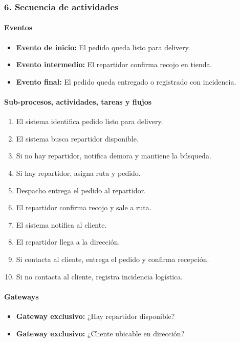 \documentclass[a4paper,12pt]{article}
\begin{document}
\subsubsection*{6. Secuencia de actividades}

\paragraph{Eventos}

\begin{itemize}
    \item \textbf{Evento de inicio:} El pedido queda listo para delivery.
    \item \textbf{Evento intermedio:} El repartidor confirma recojo en tienda.
    \item \textbf{Evento final:} El pedido queda entregado o registrado con incidencia.
\end{itemize}

\paragraph{Sub-procesos, actividades, tareas y flujos}

\begin{enumerate}
    \item El sistema identifica pedido listo para delivery.
    \item El sistema busca repartidor disponible.
    \item Si no hay repartidor, notifica demora y mantiene la búsqueda.
    \item Si hay repartidor, asigna ruta y pedido.
    \item Despacho entrega el pedido al repartidor.
    \item El repartidor confirma recojo y sale a ruta.
    \item El sistema notifica al cliente.
    \item El repartidor llega a la dirección.
    \item Si contacta al cliente, entrega el pedido y confirma recepción.
    \item Si no contacta al cliente, registra incidencia logística.
\end{enumerate}

\paragraph{Gateways}

\begin{itemize}
    \item \textbf{Gateway exclusivo:} ¿Hay repartidor disponible?
    \item \textbf{Gateway exclusivo:} ¿Cliente ubicable en dirección?
\end{itemize}
\end{document}
